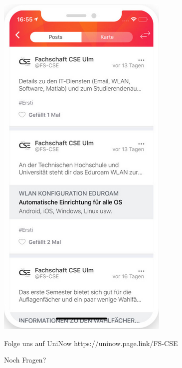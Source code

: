 \documentclass[10pt,a4paper]{beamer}
\begin{document}
\begin{frame}
\begin{center}
	\includegraphics[height=0.7\textheight]{uninow2.png}
	\end{center}
	\begin{block}{Folge uns auf UniNow}
	https://uninow.page.link/FS-CSE
	\end{block}
\end{frame}

\begin{frame}
	\begin{center}
		\Huge{Noch Fragen?}
	\end{center}
\end{frame}
\end{document}
